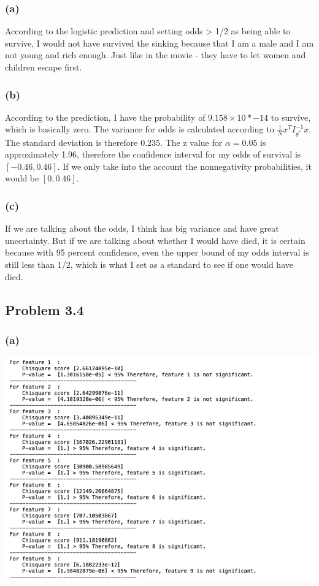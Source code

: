 \documentclass{article}
\begin{document}
\subsubsection*{(a)}
	According to the logistic prediction and setting odds > 1/2 as being able to survive,  I would not have survived the sinking because that I am a male and I am not young and rich enough. Just like in the movie - they have to let women and children escape first.
	
\subsubsection*{(b)}
	According to the prediction, I have the probability of $9.158 \times 10*{-14}$ to survive, which is basically zero. The variance for odds is calculated according to $\frac{1}{N}x^{T}I^{-1}_{\theta^{*}}x$. The standard deviation is therefore $0.235$. The z value for $\alpha = 0.05$ is approximately 1.96, therefore the confidence interval for my odds of survival is $[-0.46, 0.46 ]$. If we only take into the account the nonnegativity probabilities, it would be $[0, 0.46 ]$.
	
\subsubsection*{(c)}
	If we are talking about the odds, I think has big variance and have great uncertainty. But if we are talking about whether I would have died, it is certain because with 95 percent confidence, even the upper bound of my odds interval is still  less than 1/2, which is what I set as a standard to see if one would have died.
	
\subsection*{Problem 3.4}
\subsubsection*{(a)}
	\includegraphics[scale=0.5]{test}
	
\end{document}
